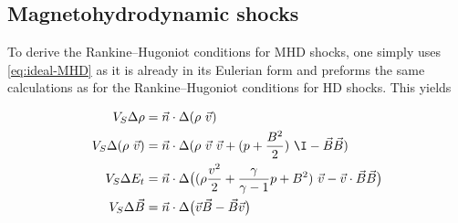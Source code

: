 \subsection*{Magnetohydrodynamic shocks}

To derive the Rankine–Hugoniot conditions for MHD shocks, one simply uses \autoref{eq:ideal-MHD} as it is already in its Eulerian form and preforms the same calculations as for the Rankine–Hugoniot conditions for HD shocks. This yields

\begin{equation}
\label{eq:MHD-shock-conditions}
\begin{split}
V_S \Delta \rho &= \vec{n}\cdot\Delta(\rho \ \vec{v})\\
V_S \Delta (\rho \ \vec{v}) &= \vec{n} \cdot \Delta(\rho \ \vec{v} \ \vec{v} + (p + \frac{B^2}{2}) \ \I -  \vec{B}\vec{B}) \\
V_S \Delta E_t &= \vec{n} \cdot \Delta \big( (\rho \frac{v^2}{2} + \frac{\gamma}{\gamma - 1} p + B^2) \ \vec{v} - \vec{v} \cdot \vec{B} \vec{B} \big) \\
V_S \Delta \vec{B} &= \vec{n} \cdot \Delta \big( \vec{v} \vec{B} - \vec{B} \vec{v} \big)
\end{split}
\end{equation}
